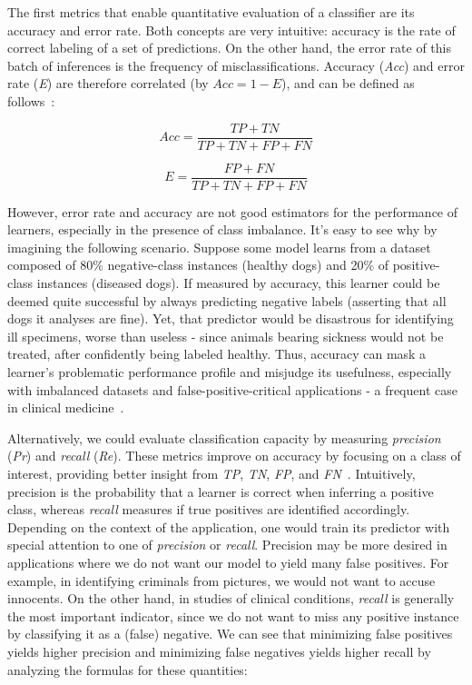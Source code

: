 The first metrics that enable quantitative evaluation of a classifier are its accuracy and error rate.
Both concepts are very intuitive: accuracy is the rate of correct labeling of a set of predictions.
On the other hand, the error rate of this batch of inferences is the frequency of misclassifications.
Accuracy (\textit{Acc}) and error rate (\textit{E}) are therefore correlated (by $Acc = 1 - E$), and can be defined as follows~\cite{Kubat2017}:

\begin{equation}
    Acc = \frac{TP+TN}{TP+TN+FP+FN}
\end{equation}

\begin{equation}
    E = \frac{FP+FN}{TP+TN+FP+FN}
\end{equation}

However, error rate and accuracy are not good estimators for the performance of learners, especially in the presence of class imbalance.
It's easy to see why by imagining the following scenario.
Suppose some model learns from a dataset composed of 80\% negative-class instances (healthy dogs) and 20\% of positive-class instances (diseased dogs).
If measured by accuracy, this learner could be deemed quite successful by always predicting negative labels (asserting that all dogs it analyses are fine).
Yet, that predictor would be disastrous for identifying ill specimens, worse than useless - since animals bearing sickness would not be treated, after confidently being labeled healthy.
Thus, accuracy can mask a learner's problematic performance profile and misjudge its usefulness, especially with imbalanced datasets and false-positive-critical applications - a frequent case in clinical medicine~\cite{Vluymans2019a}.

Alternatively, we could evaluate classification capacity by measuring \textit{precision} (\textit{Pr}) and \textit{recall} (\textit{Re}).
These metrics improve on accuracy by focusing on a class of interest, providing better insight from \textit{TP}, \textit{TN}, \textit{FP}, and \textit{FN}~\cite{Kubat2017}.
Intuitively, precision is the probability that a learner is correct when inferring a positive class, whereas \textit{recall} measures if true positives are identified accordingly.
Depending on the context of the application, one would train its predictor with special attention to one of \textit{precision} or \textit{recall}.
Precision may be more desired in applications where we do not want our model to yield many false positives.
For example, in identifying criminals from pictures, we would not want to accuse innocents.
On the other hand, in studies of clinical conditions, \textit{recall} is generally the most important indicator, since we do not want to miss any positive instance by classifying it as a (false) negative.
We can see that minimizing false positives yields higher precision and minimizing false negatives yields higher recall by analyzing the formulas for these quantities:

